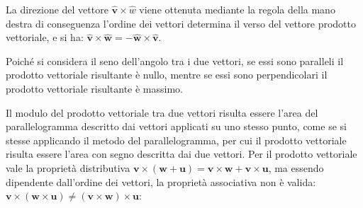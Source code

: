 \documentclass{article}
\newcommand{\vect}[1]{\boldsymbol{\mathbf{#1}}}
\numberwithin{equation}{subsection}
\begin{document}
La direzione del vettore $\hat{\vect{v}}\times\hat{w}$ viene ottenuta mediante la regola della mano destra
di conseguenza l'ordine dei vettori determina il verso del vettore prodotto vettoriale, e si ha: $\hat{\vect{v}}\times\hat{\vect{w}} = -\hat{\vect{w}}\times\hat{\vect{v}}$.



Poiché si considera il seno dell'angolo tra i due vettori, se essi sono paralleli il prodotto vettoriale risultante è nullo, mentre se essi 
sono perpendicolari il prodotto vettoriale risultante è massimo. 


Il modulo del prodotto vettoriale tra due vettori risulta essere l'area del 
parallelogramma descritto dai vettori applicati su uno stesso punto, come se si stesse applicando il metodo del parallelogramma, per cui 
il prodotto vettoriale risulta essere l'area con segno descritta dai due vettori. 
Per il prodotto vettoriale vale la proprietà distributiva 
$\vect{v}\times(\vect{w} +\vect{u}) = \vect{v}\times\vect{w} + \vect{v}\times\vect{u}$, 
ma essendo 
dipendente dall'ordine dei vettori, la proprietà associativa 
non è valida: 
$\vect{v}\times(\vect{w}\times\vect{u}) \neq (\vect{v}\times\vect{w})\times\vect{u}$:
\end{document}
